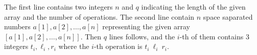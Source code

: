 The first line contains two integers $n$ and $q$ indicating 
the length of the given array and the number of operations.
The second line contain $n$ space saparated numbers 
$a[1],a[2],\dots,a[n]$
representing 
the given array $[a[1],a[2],\dots,a[n]]$.
Then $q$ lines follows, and the $i$-th of them contains $3$ integers 
$t_{i}, \ell_{i}, r_{i}$ where the $i$-th operation
is $t_i~\ell_i~r_i$.
